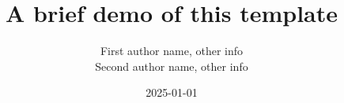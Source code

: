 \documentclass[handout,aspectratio=169]{beamer}
\date{2025-01-01}
\title{%
	A brief demo of this template
}
\author{%
	First author name, other info\\
	Second author name, other info
}
\begin{document}
	\begin{frame}
		\titlepage
	\end{frame}

	
\end{document}
